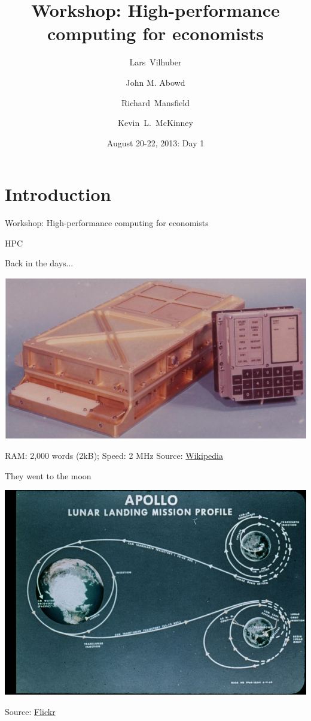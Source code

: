 \documentclass[xcolor=table,compress]{beamer}
\title[Computing for Economists]{Workshop: High-performance computing for economists}
\author[Vilhuber, Abowd, Mansfield, McKinney]{%
  Lars~Vilhuber\inst{1} \and
  John M. Abowd\inst{1} \and
  Richard~Mansfield\inst{1} \and
  Kevin~L.~McKinney %
}
\institute[Cornell]{
  \inst{1}%
   Cornell University, Economics Department,
}%
\date[August 20-22, 2013]{August 20-22, 2013: Day 1}
\begin{document}
\frame{\titlepage}


\section[Intro]{Introduction}


\begin{frame}
Workshop: High-performance computing for economists
\end{frame}


\begin{frame}{HPC}
\begin{block}{Back in the days...}
\begin{center}
\includegraphics[height=0.6\textheight]{./Agc_view}
\end{center}
\end{block}
\pause
RAM: 2,000 words (2kB); Speed: 2 MHz
\newline
\tiny Source: \href{http://upload.wikimedia.org/wikipedia/commons/7/79/Agc_view.jpg}{Wikipedia}
\end{frame}

\begin{frame}{They went to the moon}
\begin{center}
\includegraphics[height=0.7\textheight]{./apollo-11-path}
\end{center}
\tiny Source:  \href{http://farm2.staticflickr.com/1208/5105040212_346b792ee5_z.jpg}{Flickr}
\end{frame}
\end{document}
